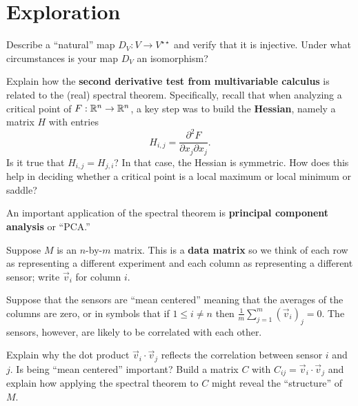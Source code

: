 \documentclass{homework}
\begin{document}





\section{Exploration}

\begin{problem}
  Describe a ``natural'' map $D_V : V \to V^{\star\star}$ and verify
  that it is injective.  Under what circumstances is your map $D_V$ an
  isomorphism?
\end{problem}

\begin{problem}
  Explain how the \textbf{second derivative test from multivariable
    calculus} is related to the (real) spectral theorem.  Specifically, recall that when analyzing a critical point of $F : \mathbb{R}^n \to \mathbb{R}^n$, a key step was to build the \textbf{Hessian}, namely a matrix $H$ with entries
  \[
    H_{i,j} = \frac{\partial^2 F}{\partial x_j \partial x_j}.
  \]
  Is it true that $H_{i,j} = H_{j,i}$?  In that case, the Hessian is
  symmetric.  How does this help in deciding whether a critical point
  is a local maximum or local minimum or saddle?
\end{problem}

\begin{problem}\label{principal-component-analysis}An important application of the spectral theorem is
  \textbf{principal component analysis} or ``PCA.''

  Suppose $M$ is an $n$-by-$m$ matrix.  This is a \textbf{data matrix}
  so we think of each row as representing a different experiment and
  each column as representing a different sensor; write $\vec{v}_i$
  for column $i$.

  Suppose that the sensors are ``mean centered'' meaning that the
  averages of the columns are zero, or in symbols that if
  $1 \leq i \neq n$ then
  \(\displaystyle\frac{1}{m} \sum_{j=1}^m \left(\vec{v}_i\right)_j =
  0\).  The sensors, however, are likely to be correlated with each
  other.

  Explain why the dot product $\vec{v}_i \cdot \vec{v}_j$ reflects the
  correlation between sensor $i$ and $j$.  Is being ``mean centered''
  important?  Build a matrix $C$ with
  $C_{ij} = \vec{v}_i \cdot \vec{v}_j$ and explain how applying the
  spectral theorem to $C$ might reveal the ``structure'' of $M$.
\end{problem}
\end{document}

